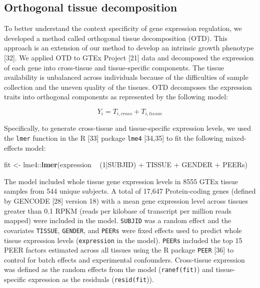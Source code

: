 \documentclass[]{article}
\newenvironment{Shaded}{\begin{snugshade}}{\end{snugshade}}
\newcommand{\KeywordTok}[1]{\textcolor[rgb]{0.13,0.29,0.53}{\textbf{{#1}}}}
\newcommand{\DecValTok}[1]{\textcolor[rgb]{0.00,0.00,0.81}{{#1}}}
\newcommand{\StringTok}[1]{\textcolor[rgb]{0.31,0.60,0.02}{{#1}}}
\newcommand{\NormalTok}[1]{{#1}}
\begin{document}
\subsection{Orthogonal tissue
decomposition}\label{orthogonal-tissue-decomposition}

To better understand the context specificity of gene expression
regulation, we developed a method called orthogonal tissue decomposition
(OTD). This approach is an extension of our method to develop an
intrinsic growth phenotype {[}32{]}. We applied OTD to GTEx Project
{[}21{]} data and decomposed the expression of each gene into
cross-tissue and tissue-specific components. The tissue availability is
unbalanced across individuals because of the difficulties of sample
collection and the uneven quality of the tissues. OTD decomposes the
expression traits into orthogonal components as represented by the
following model:

\[ Y_i = T_{i,cross} + T_{i,tissue} \]

Specifically, to generate cross-tissue and tissue-specific expression
levels, we used the \texttt{lmer} function in the R {[}33{]} package
\texttt{lme4} {[}34,35{]} to fit the following mixed-effects model:

\begin{Shaded}
\begin{Highlighting}[]
\NormalTok{fit <-}\StringTok{ }\NormalTok{lme4::}\KeywordTok{lmer}\NormalTok{(expression ~}\StringTok{ }\NormalTok{(}\DecValTok{1}\NormalTok{|SUBJID) +}\StringTok{ }\NormalTok{TISSUE +}\StringTok{ }\NormalTok{GENDER +}\StringTok{ }\NormalTok{PEERs)}
\end{Highlighting}
\end{Shaded}

The model included whole tissue gene expression levels in 8555 GTEx
tissue samples from 544 unique subjects. A total of 17,647
Protein-coding genes (defined by GENCODE {[}28{]} version 18) with a
mean gene expression level across tissues greater than 0.1 RPKM (reads
per kilobase of transcript per million reads mapped) were included in
the model. \texttt{SUBJID} was a random effect and the covariates
\texttt{TISSUE}, \texttt{GENDER}, and \texttt{PEERs} were fixed effects
used to predict whole tissue expression levels (\texttt{expression} in
the model). \texttt{PEERs} included the top 15 PEER factors estimated
across all tissues using the R package \texttt{PEER} {[}36{]} to control
for batch effects and experimental confounders. Cross-tissue expression
was defined as the random effects from the model (\texttt{ranef(fit)})
and tissue-specific expression as the residuals (\texttt{resid(fit})).
\end{document}
